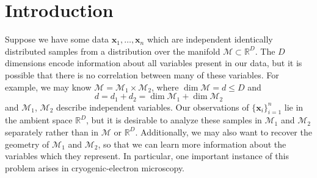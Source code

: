 \documentclass{article}
\numberwithin{equation}{section}
\theoremstyle{definition}
\begin{document}
\section{Introduction}
Suppose we have some data $\textbf{x}_1, \ldots, \textbf{x}_n$ which are independent identically distributed samples from a distribution over the manifold $\mathcal{M} \subset \mathbb{R}^D$. The $D$ dimensions encode information about all variables present in our data, but it is possible that there is no correlation between many of these variables. For example, we may know $\mathcal{M} = \mathcal{M}_1 \times \mathcal{M}_2$, where $\dim\mathcal{M} = d \le D$ and
\[
d = d_1+d_2 = \dim\mathcal{M}_1 + \dim\mathcal{M}_2
\]
and $\mathcal{M}_1$, $\mathcal{M}_2$ describe independent variables. Our observations of $\{\textbf{x}_i\}_{i=1}^n$ lie in the ambient space $\mathbb{R}^D$, but it is desirable to analyze these samples in $\mathcal{M}_1$ and $\mathcal{M}_2$ separately rather than in $\mathcal{M}$ or $\mathbb{R}^D$. Additionally, we may also want to recover the geometry of $\mathcal{M}_1$ and $\mathcal{M}_2$, so that we can learn more information about the variables which they represent. In particular, one important instance of this problem arises in cryogenic-electron microscopy.
\end{document}
